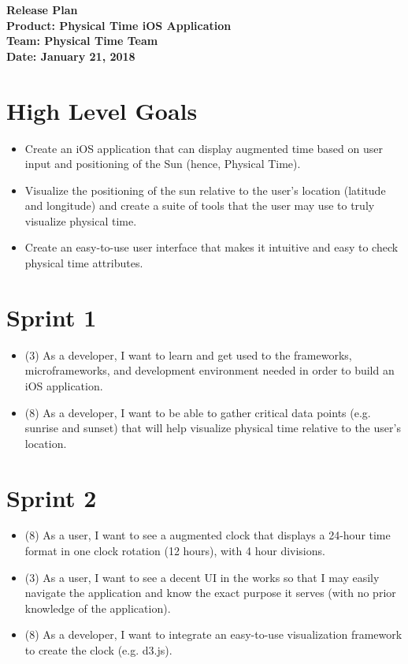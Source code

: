 \documentclass[11pt]{article}
\begin{document}
	\Large{\textbf{Release Plan}}\\
	\Large{\textbf{Product: Physical Time iOS Application}}\\
	\Large{\textbf{Team: Physical Time Team}}\\
	\Large{\textbf{Date: January 21, 2018}}\\
	
	\vspace{-3mm}
	
	\section*{High Level Goals}
		\vspace{-3mm}
		\begin{itemize}
			\item Create an iOS application that can display augmented time based on user input and positioning of the Sun (hence, Physical Time).
			\item Visualize the positioning of the sun relative to the user's location (latitude and longitude) and create a suite of tools that the user may use to truly visualize physical time.
			\item Create an easy-to-use user interface that makes it intuitive and easy to check physical time attributes.
		\end{itemize}
	\section*{Sprint 1}
		\vspace{-3mm}
		\begin{itemize}
		    \item (3) As a developer, I want to learn and get used to the frameworks, microframeworks, and development environment needed in order to build an iOS application.
		    \item (8) As a developer, I want to be able to gather critical data points (e.g. sunrise and sunset) that will help visualize physical time relative to the user's location.
		\end{itemize}
	\section*{Sprint 2}
	    \vspace{-3mm}
	    \begin{itemize}
		    \item (8) As a user, I want to see a augmented clock that displays a 24-hour time format in one clock rotation (12 hours), with 4 hour divisions.
		    \item (3) As a user, I want to see a decent UI in the works so that I may easily navigate the application and know the exact purpose it serves (with no prior knowledge of the application).
		    \item (8) As a developer, I want to integrate an easy-to-use visualization framework to create the clock (e.g. d3.js).
		\end{itemize}
\end{document}
